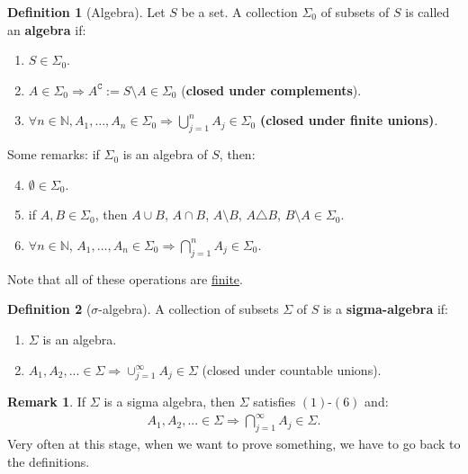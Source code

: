\documentclass[11pt]{article}
\theoremstyle{definition}
\newtheorem{defn}{Definition}[section]
\newtheorem{rmk}{Remark}[section]
\theoremstyle{theorem}
\newcommand{\N}[0]{\mathbb{N}}
\newcommand{\comp}[1]{{#1}^{\texttt{C}}}
\begin{document}
\begin{defn}[Algebra]
	Let \( S \) be a set. A collection \( \Sigma_0 \) of subsets of \( S \) is called an \textbf{algebra} if: 	
	\begin{enumerate}[noitemsep]
		\item \( S \in \Sigma_0 \). 
		\item \( A \in \Sigma_0 \Rightarrow \comp{A} := S \setminus A \in \Sigma_0 \) (\textbf{closed under complements}).
		\item \( \forall n \in \N, A_1, ..., A_n \in \Sigma_0 \Rightarrow \bigcup_{j=1}^n A_j \in \Sigma_0 \) \textbf{(closed under finite unions)}.
	\end{enumerate}
\end{defn}

Some remarks: if \( \Sigma_0 \) is an algebra of \( S \), then: 

\begin{enumerate}[noitemsep]
	\setcounter{enumi}{3}
	\item \( \emptyset \in \Sigma_0 \).
	\item if \( A, B \in \Sigma_0 \), then \( A \cup B \), \( A \cap B \), \( A \setminus B \), \( A \triangle B \), \( B \setminus A  \in  \Sigma_0 \).
	\item \( \forall n \in \N \), \( A_1, ..., A_n \in \Sigma_0  \Rightarrow \bigcap_{j=1}^n A_j \in \Sigma_0 \).
\end{enumerate}
Note that all of these operations are \underline{finite}.


\begin{defn}[\(\sigma\)-algebra]
	A collection of subsets \( \Sigma \) of \( S \) is a \textbf{sigma-algebra} if:
	\begin{enumerate}[noitemsep]
		\item \( \Sigma \) is an algebra.
		\item \( A_1, A_2, ... \in \Sigma \Rightarrow \cup_{j=1}^\infty A_j \in \Sigma \) (closed under countable unions).
	\end{enumerate}
\end{defn}

\begin{rmk}
If \( \Sigma \) is a sigma algebra, then \( \Sigma \) satisfies \( (1) \)-\( (6) \) and: 
\begin{align}
	A_1, A_2, ... \in \Sigma \Rightarrow \bigcap_{j=1}^\infty A_j \in \Sigma.
\end{align}	
Very often at this stage, when we want to prove something, we have to go back to the definitions.
\end{rmk}
\end{document}

